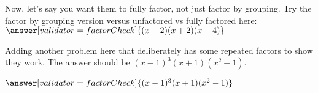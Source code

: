 \documentclass{ximera}
\begin{document}
        \begin{problem}
            Now, let's say you want them to fully factor, not just factor by grouping. 
            Try the factor by grouping version versus unfactored vs fully factored here: $\answer[validator=factorCheck]{(x-2)(x+2)(x-4)}$
        \end{problem}
        
        \begin{problem}
            Adding another problem here that deliberately has some repeated factors to show they work. 
            The answer should be $(x-1)^3(x+1)(x^2-1)$.
            
            $\answer[validator=factorCheck]{(x-1)^3(x+1)(x^2-1)}$
        \end{problem}


\hrulefill
\end{document}
